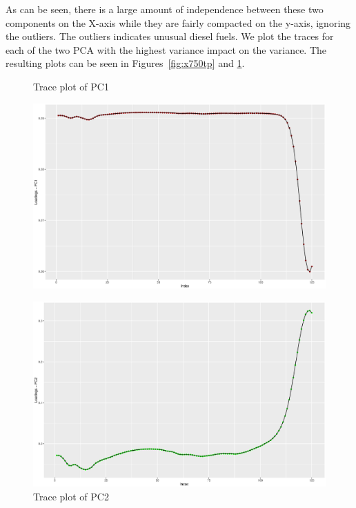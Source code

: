 \documentclass[a4paper,12pt]{article}
\begin{document}
    As can be seen, there is a large amount of independence between these two components on the X-axis while they are fairly compacted on the y-axis, ignoring the outliers. The outliers indicates unusual diesel fuels. We plot the traces for each of the two PCA with the highest variance impact on the variance. The resulting plots can be seen in Figures~\ref{fig:x750tp} and \ref{fig:x752tp}.
    \begin{figure}[H]      
    \centering
    \begin{minipage}[]{0.49\textwidth}
    \caption{Trace plot of PC1}
    \label{fig:x750tp}
    \includegraphics[width=\textwidth]{figures/A2_trace_PC1.eps}     
    \end{minipage}
    \begin{minipage}[]{0.49\textwidth}
    \caption{Trace plot of PC2}
    \label{fig:x752tp}
    \includegraphics[width=\textwidth]{figures/A2_trace_PC2.eps}
    \end{minipage}
    \end{figure}
\end{document}
